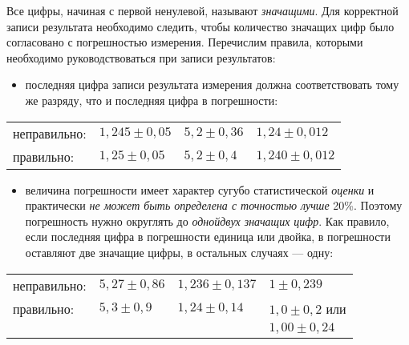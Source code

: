 \documentclass[10pt]{article}
\begin{document}
Все цифры, начиная с первой ненулевой, называют \emph{значащими}.
Для корректной записи результата необходимо следить, чтобы количество
значащих цифр было согласовано с погрешностью измерения. Перечислим
правила, которыми необходимо руководствоваться при записи результатов: 
\begin{itemize}
\item последняя цифра записи результата измерения должна соответствовать
тому же разряду, что и последняя цифра в погрешности:
\end{itemize}
\noindent%
\begin{tabular}{llll}
неправильно:  & $1{,}245\pm0{,}05$  & $5{,}2\pm0{,}36$  & $1{,}24\pm0{,}012$\tabularnewline
правильно:  & $1{,}25\pm0{,}05$  & $5{,}2\pm0{,}4$  & $1{,}240\pm0{,}012$ \tabularnewline
\end{tabular}
\begin{itemize}
\item величина погрешности имеет характер сугубо статистической \emph{оценки}
и практически \emph{не может быть определена с точностью лучше} 20\%.
Поэтому погрешность нужно округлять до \emph{одной\textendash двух
значащих цифр}. Как правило, если последняя цифра в погрешности единица
или двойка, в погрешности оставляют две значащие цифры, в остальных
случаях --- одну:
\end{itemize}
\noindent%
\begin{tabular}{llll}
неправильно:  & $5{,}27\pm0{,}86$  & $1{,}236\pm0{,}137$  & $1\pm0{,}239$\tabularnewline
правильно:  & $5{,}3\pm0{,}9$ & $1{,}24\pm0{,}14$ & $1{,}0\pm0{,}2$ или\tabularnewline
 &  &  & $1{,}00\pm0{,}24$\tabularnewline
\end{tabular}

\medskip{}
\end{document}
